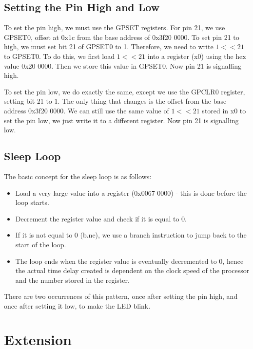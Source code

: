 \documentclass[11pt]{article}
\begin{document}
\subsection{Setting the Pin High and Low}

To set the pin high, we must use the GPSET registers. For pin 21, we use GPSET0, offset at 0x1c from the base address of 0x3f20 0000. To set pin 21 to high, we must set bit 21 of GPSET0 to 1. Therefore, we need to write $1 << 21$ to GPSET0. To do this, we first load $1 << 21$ into a register (x0) using the hex value 0x20 0000. Then we store this value in GPSET0. Now pin 21 is signalling high.

To set the pin low, we do exactly the same, except we use the GPCLR0 register, setting bit 21 to 1. The only thing that changes is the offset from the base address 0x3f20 0000. We can still use the same value of $1 << 21$ stored in x0 to set the pin low, we just write it to a different register. Now pin 21 is signalling low.

\subsection{Sleep Loop}

The basic concept for the sleep loop is as follows:
\begin{itemize}
    \vspace{-0.3cm}\item Load a very large value into a register (0x0067 0000) - this is done before the loop starts.
    \vspace{-0.3cm}\item Decrement the register value and check if it is equal to 0.
    \vspace{-0.3cm}\item If it is not equal to 0 (b.ne), we use a branch instruction to jump back to the start of the loop.
    \vspace{-0.3cm}\item The loop ends when the register value is eventually decremented to 0, hence the actual time delay created is dependent on the clock speed of the processor and the number stored in the register.
\end{itemize}
\noindent There are two occurrences of this pattern, once after setting the pin high, and once after setting it low, to make the LED blink.
\vspace{-0.3cm}
\section{Extension}
\end{document}
